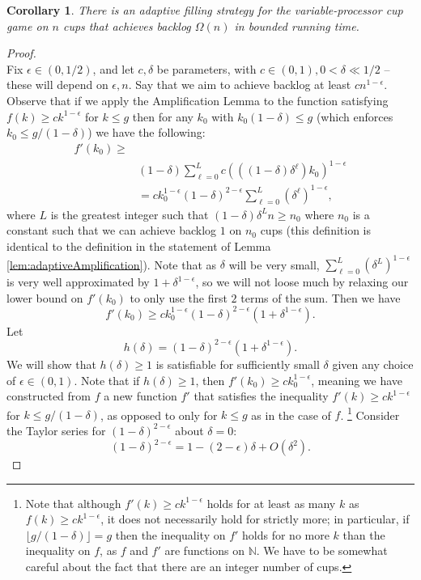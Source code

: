 \documentclass[twocolumn]{article}[11pt]
\newtheorem{corollary}{Corollary}
\begin{document}
\begin{corollary}
  \label{cor:adaptivePoly}
  There is an adaptive filling strategy for the variable-processor cup game on
  $n$ cups that achieves backlog $\Omega(n)$ in bounded running time.
\end{corollary}
\begin{proof}$ $\\
  Fix $\epsilon \in (0,1/2)$, and let $c, \delta$ be parameters, with $c\in
  (0,1), 0 < \delta \ll 1/2$ -- these will depend on $\epsilon, n$.
  Say that we aim to achieve backlog at least $cn^{1-\epsilon}$.
  Observe that if we apply the Amplification Lemma to the function satisfying
  $f(k) \ge ck^{1-\epsilon}$ for $k \le g$ then for any $k_0$ with
  $k_0(1-\delta)\le g$ (which enforces $k_0 \le g/ (1-\delta)$) we have the
  following:
  \begin{align*}
  f'(k_0)\ge&\\
  &(1-\delta)\sum_{\ell=0}^L c (((1-\delta)\delta^\ell)k_0)^{1-\epsilon}\\
  &= ck_0^{1-\epsilon} (1-\delta)^{2-\epsilon} \sum_{\ell=0}^L (\delta^\ell)^{1-\epsilon},
  \end{align*}
  where $L$ is the greatest integer such that $(1-\delta)\delta^Ln \ge n_0$
  where $n_0$ is a constant such that we can achieve backlog $1$ on $n_0$ cups
  (this definition is identical to the definition in the statement of Lemma
  \ref{lem:adaptiveAmplification}).
  Note that as $\delta$ will be very small, $\sum_{\ell=0}^L
  (\delta^L)^{1-\epsilon}$ is very well approximated by
  $1+\delta^{1-\epsilon}$, so we will not loose much by relaxing our lower
  bound on $f'(k_0)$ to only use the first $2$ terms of the sum. Then we have 
  $$f'(k_0) \ge ck_0^{1-\epsilon}(1-\delta)^{2-\epsilon}(1+\delta^{1-\epsilon}).$$
  Let 
  $$h(\delta) = (1-\delta)^{2-\epsilon}(1+\delta^{1-\epsilon}).$$
  We will show that $h(\delta) \ge 1$ is satisfiable for sufficiently small $\delta$ given any choice of $\epsilon \in (0,1)$.
  Note that if $h(\delta)\ge 1$, then $f'(k_0) \ge c
  k_0^{1-\epsilon}$, meaning we have constructed from $f$ a new function $f'$ that satisfies the inequality
  $f'(k) \ge ck^{1-\epsilon}$ for $k\le g/(1-\delta)$, as opposed to only for
  $k \le g$ as in the case of $f$.
  \footnote{Note that although $f'(k) \ge ck^{1-\epsilon}$ holds for at least as many $k$
    as $f(k) \ge c k^{1-\epsilon}$, it does not necessarily hold for strictly
    more; in particular, if $\lfloor g/(1-\delta) \rfloor = g$ then the inequality on
    $f'$ holds for no more $k$ than the inequality on $f$, as $f$ and $f'$ are
    functions on $\mathbb{N}$. We have to be somewhat careful about the fact that
    there are an integer number of cups.
  }
  Consider the Taylor series for $(1-\delta)^{2-\epsilon}$ about $\delta = 0$:
  $$(1-\delta)^{2-\epsilon} = 1 - (2-\epsilon)\delta + O(\delta^2).$$
 

\end{proof}
\end{document}
